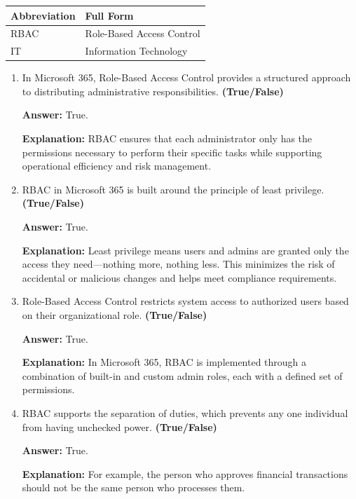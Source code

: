 \documentclass[10pt]{article}
\begin{document}
\begin{center}
\begin{tabular}{>{\raggedright\arraybackslash}p{} >{\raggedright\arraybackslash}p{}}
\toprule
\textbf{Abbreviation} & \textbf{Full Form} \\
\midrule
RBAC & Role-Based Access Control \\
IT & Information Technology \\
\end{tabular}
\end{center}

\begin{enumerate}[leftmargin=*]

\item In Microsoft 365, Role-Based Access Control provides a structured approach to distributing administrative responsibilities. \textbf{(True/False)}

\textbf{Answer:} True.

\textbf{Explanation:} RBAC ensures that each administrator only has the permissions necessary to perform their specific tasks while supporting operational efficiency and risk management.

\item RBAC in Microsoft 365 is built around the principle of least privilege. \textbf{(True/False)}

\textbf{Answer:} True.

\textbf{Explanation:} Least privilege means users and admins are granted only the access they need—nothing more, nothing less. This minimizes the risk of accidental or malicious changes and helps meet compliance requirements.

\item Role-Based Access Control restricts system access to authorized users based on their organizational role. \textbf{(True/False)}

\textbf{Answer:} True.

\textbf{Explanation:} In Microsoft 365, RBAC is implemented through a combination of built-in and custom admin roles, each with a defined set of permissions.

\item RBAC supports the separation of duties, which prevents any one individual from having unchecked power. \textbf{(True/False)}

\textbf{Answer:} True.

\textbf{Explanation:} For example, the person who approves financial transactions should not be the same person who processes them.


\end{enumerate}
\end{document}
